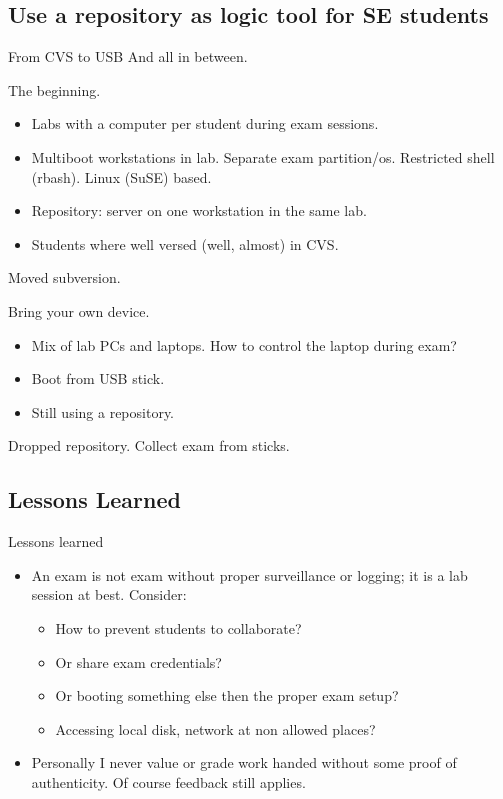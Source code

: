 \subsection[Repository]{Use a repository as logic tool for SE students}
\begin{frame}{From CVS to USB}
  And all in between.
  \begin{description}[short]
  \item[2005] The beginning.
    \begin{itemize}
    \item Labs with a computer per student during exam sessions.
    \item Multiboot workstations in lab. Separate exam 
      partition/os. Restricted shell (rbash). Linux (SuSE) based.
    \item Repository:  server on one workstation in the same lab.
    \item Students where well versed (well, almost) in CVS.
    \end{itemize}
  \item[2009] Moved subversion.
  \item[2012] Bring your own device.
    \begin{itemize}
    \item Mix of lab PCs and laptops. How to control the laptop during exam?
    \item Boot from USB stick.
    \item Still using a repository.
    \end{itemize}
  \item[2015] Dropped repository. Collect exam from sticks.
  \end{description}
\end{frame}

\subsection[Lessons]{Lessons Learned}
\begin{frame}{Lessons learned}
  \begin{itemize}
  \item An exam is not exam without proper surveillance or logging; it
    is a lab session at best. Consider:
    \begin{itemize}
    \item How to prevent students to collaborate?
    \item Or share exam credentials?
    \item Or booting something else then the proper exam setup?
    \item Accessing local disk, network at non allowed places?
    \end{itemize}
  \item Personally I never value or grade work handed without some
    proof of authenticity. Of course feedback still applies.
  \end{itemize}
\end{frame}

